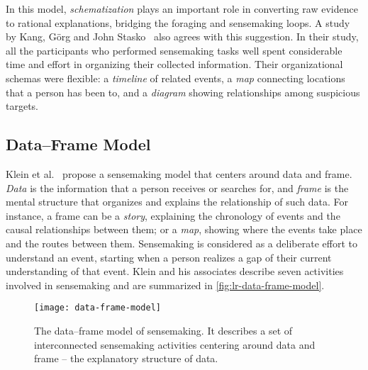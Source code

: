 In this model, \emph{schematization} plays an important role in converting raw evidence to rational explanations, bridging the foraging and sensemaking loops. A study by Kang, Görg and John Stasko~\cite{Kang2011} also agrees with this suggestion. In their study, all the participants who performed sensemaking tasks well spent considerable time and effort in organizing their collected information. Their organizational schemas were flexible: a \emph{timeline} of related events, a \emph{map} connecting locations that a person has been to, and a \emph{diagram} showing relationships among suspicious targets. 

\subsection{Data--Frame Model}
\label{sub:lr-dfm}
Klein et al.~\cite{Klein2003} propose a sensemaking model that centers around data and frame. \emph{Data} is the information that a person receives or searches for, and \emph{frame} is the mental structure that organizes and explains the relationship of such data. For instance, a frame can be a \emph{story}, explaining the chronology of events and the causal relationships between them; or a \emph{map}, showing where the events take place and the routes between them. Sensemaking is considered as a deliberate effort to understand an event, starting when a person realizes a gap of their current understanding of that event. Klein and his associates describe seven activities involved in sensemaking and are summarized in \autoref{fig:lr-data-frame-model}.

\begin{figure}[!htb]
	\centering
	\texttt{[image: data-frame-model]}
	\caption[The data--frame model of sensemaking]{The data--frame model of sensemaking. It describes a set of interconnected sensemaking activities centering around data and frame -- the explanatory structure of data. }
	\label{fig:lr-data-frame-model}
\end{figure}


